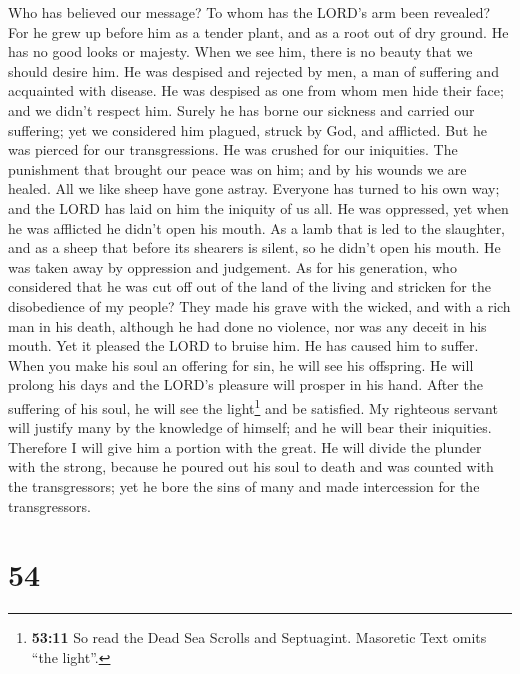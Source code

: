 Who has believed our message? To whom has the LORD's arm
been revealed?  For he grew up before him as a tender
plant, and as a root out of dry ground. He has no good looks or majesty.
When we see him, there is no beauty that we should desire him.
 He was despised and rejected by men, a man of suffering
and acquainted with disease. He was despised as one from whom men hide
their face; and we didn't respect him.  Surely he has
borne our sickness and carried our suffering; yet we considered him
plagued, struck by God, and afflicted.  But he was pierced
for our transgressions. He was crushed for our iniquities. The
punishment that brought our peace was on him; and by his wounds we are
healed.  All we like sheep have gone astray. Everyone has
turned to his own way; and the LORD has laid on him the iniquity of us
all.  He was oppressed, yet when he was afflicted he
didn't open his mouth. As a lamb that is led to the slaughter, and as a
sheep that before its shearers is silent, so he didn't open his mouth.
 He was taken away by oppression and judgement. As for his
generation, who considered that he was cut off out of the land of the
living and stricken for the disobedience of my people? 
They made his grave with the wicked, and with a rich man in his death,
although he had done no violence, nor was any deceit in his mouth.
 Yet it pleased the LORD to bruise him. He has caused him
to suffer. When you make his soul an offering for sin, he will see his
offspring. He will prolong his days and the LORD's pleasure will prosper
in his hand.  After the suffering of his soul, he will
see the light\footnote{\textbf{53:11} So read the Dead Sea Scrolls and
  Septuagint. Masoretic Text omits ``the light''.} and be satisfied. My
righteous servant will justify many by the knowledge of himself; and he
will bear their iniquities.  Therefore I will give him a
portion with the great. He will divide the plunder with the strong,
because he poured out his soul to death and was counted with the
transgressors; yet he bore the sins of many and made intercession for
the transgressors.

\hypertarget{section-51}{%
\section{54}\label{section-51}}

